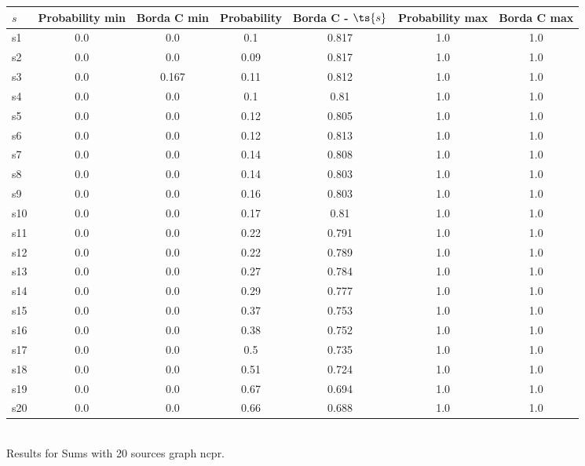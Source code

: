 \documentclass{article}
\begin{document}
\noindent\begin{tabular}{|l|c|c|c|c|c|c|}
\hline
$s$& Probability min & Borda C min & Probability & Borda C - $\ts{s}$ & Probability max & Borda C max\\
\hline
s1 &0.0 & 0.0 & 0.1 & 0.817 & 1.0 & 1.0\\
\hline
s2 &0.0 & 0.0 & 0.09 & 0.817 & 1.0 & 1.0\\
\hline
s3 &0.0 & 0.167 & 0.11 & 0.812 & 1.0 & 1.0\\
\hline
s4 &0.0 & 0.0 & 0.1 & 0.81 & 1.0 & 1.0\\
\hline
s5 &0.0 & 0.0 & 0.12 & 0.805 & 1.0 & 1.0\\
\hline
s6 &0.0 & 0.0 & 0.12 & 0.813 & 1.0 & 1.0\\
\hline
s7 &0.0 & 0.0 & 0.14 & 0.808 & 1.0 & 1.0\\
\hline
s8 &0.0 & 0.0 & 0.14 & 0.803 & 1.0 & 1.0\\
\hline
s9 &0.0 & 0.0 & 0.16 & 0.803 & 1.0 & 1.0\\
\hline
s10 &0.0 & 0.0 & 0.17 & 0.81 & 1.0 & 1.0\\
\hline
s11 &0.0 & 0.0 & 0.22 & 0.791 & 1.0 & 1.0\\
\hline
s12 &0.0 & 0.0 & 0.22 & 0.789 & 1.0 & 1.0\\
\hline
s13 &0.0 & 0.0 & 0.27 & 0.784 & 1.0 & 1.0\\
\hline
s14 &0.0 & 0.0 & 0.29 & 0.777 & 1.0 & 1.0\\
\hline
s15 &0.0 & 0.0 & 0.37 & 0.753 & 1.0 & 1.0\\
\hline
s16 &0.0 & 0.0 & 0.38 & 0.752 & 1.0 & 1.0\\
\hline
s17 &0.0 & 0.0 & 0.5 & 0.735 & 1.0 & 1.0\\
\hline
s18 &0.0 & 0.0 & 0.51 & 0.724 & 1.0 & 1.0\\
\hline
s19 &0.0 & 0.0 & 0.67 & 0.694 & 1.0 & 1.0\\
\hline
s20 &0.0 & 0.0 & 0.66 & 0.688 & 1.0 & 1.0\\
\hline
\end{tabular}\\

\noindent Results for Sums with 20 sources graph ncpr.
\end{document}
